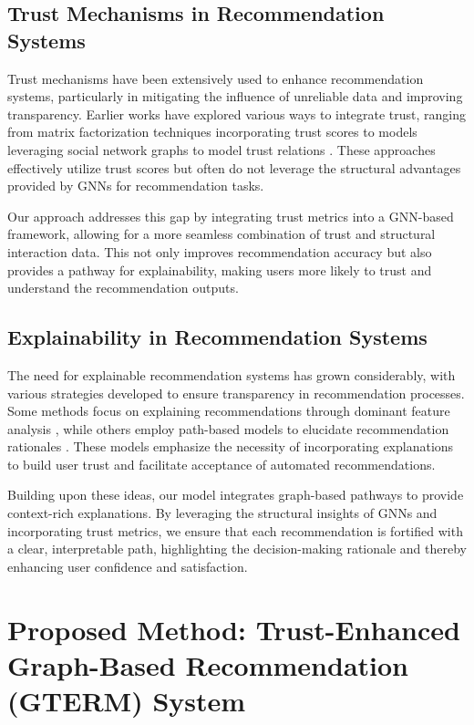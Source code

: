 \documentclass{article} %
\begin{document}
\subsection{Trust Mechanisms in Recommendation Systems}
Trust mechanisms have been extensively used to enhance recommendation systems, particularly in mitigating the influence of unreliable data and improving transparency. Earlier works have explored various ways to integrate trust, ranging from matrix factorization techniques incorporating trust scores \citep{guo2017trust, massa2007trust, lathia2008trust} to models leveraging social network graphs to model trust relations \citep{konstas2009social, ma2011recommender}. These approaches effectively utilize trust scores but often do not leverage the structural advantages provided by GNNs for recommendation tasks.

Our approach addresses this gap by integrating trust metrics into a GNN-based framework, allowing for a more seamless combination of trust and structural interaction data. This not only improves recommendation accuracy but also provides a pathway for explainability, making users more likely to trust and understand the recommendation outputs.

\subsection{Explainability in Recommendation Systems}
The need for explainable recommendation systems has grown considerably, with various strategies developed to ensure transparency in recommendation processes. Some methods focus on explaining recommendations through dominant feature analysis \citep{zhang2014explicit, tan2016cross, zhang2018visual}, while others employ path-based models to elucidate recommendation rationales \citep{he2015trirank, yu2013cubinet}. These models emphasize the necessity of incorporating explanations to build user trust and facilitate acceptance of automated recommendations.

Building upon these ideas, our model integrates graph-based pathways to provide context-rich explanations. By leveraging the structural insights of GNNs and incorporating trust metrics, we ensure that each recommendation is fortified with a clear, interpretable path, highlighting the decision-making rationale and thereby enhancing user confidence and satisfaction.



\section{Proposed Method: Trust-Enhanced Graph-Based Recommendation (GTERM) System}
\end{document}
